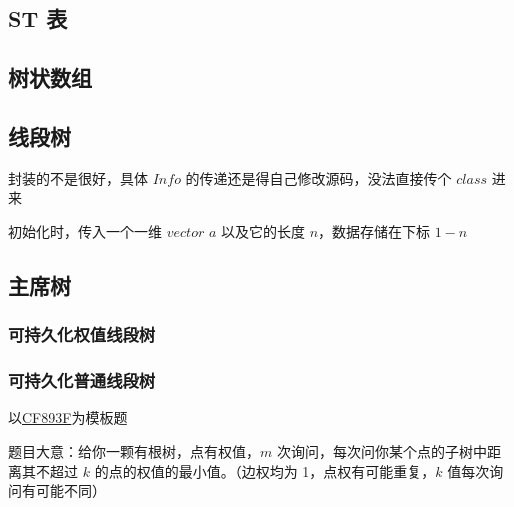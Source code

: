 \documentclass[12pt]{article}
\begin{document}


\newpage

\subsection{ST 表}



\newpage

\subsection{树状数组}



\newpage

\subsection{线段树}

封装的不是很好，具体 $Info$ 的传递还是得自己修改源码，没法直接传个 $class$ 进来

初始化时，传入一个一维 $vector$ $a$ 以及它的长度 $n$，数据存储在下标 $1-n$



\newpage

\subsection{主席树}

\subsubsection{可持久化权值线段树}



\newpage

\subsubsection{可持久化普通线段树}

以\href{http://codeforces.com/problemset/problem/893/F}{CF893F}为模板题

题目大意：给你一颗有根树，点有权值，$m$ 次询问，每次问你某个点的子树中距离其不超过 $k$ 的点的权值的最小值。（边权均为 1，点权有可能重复，$k$ 值每次询问有可能不同）
\end{document}
